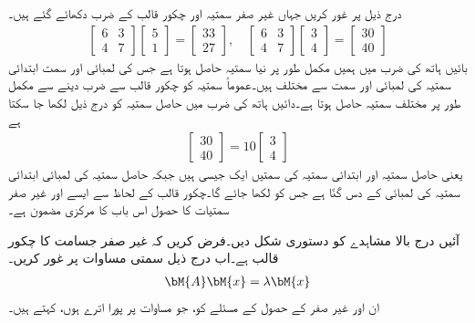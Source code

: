 درج ذیل پر غور کریں جہاں غیر صفر سمتیہ اور چکور قالب کے ضرب دکھائے گئے ہیں۔
\begin{align}\label{مساوات_امتیازی_پہلی_مثال}
\begin{bmatrix}6&3\\4&7  \end{bmatrix}\begin{bmatrix} 5\\1 \end{bmatrix}=\begin{bmatrix}33\\27  \end{bmatrix},\quad \begin{bmatrix}6&3\\4&7  \end{bmatrix}\begin{bmatrix} 3\\4 \end{bmatrix}=\begin{bmatrix}30\\40  \end{bmatrix}
\end{align} 
بائیں ہاتھ کی ضرب میں ہمیں مکمل طور پر نیا سمتیہ حاصل ہوتا ہے جس کی لمبائی اور سمت ابتدائی سمتیہ کی لمبائی اور سمت  سے مختلف ہیں۔عموماً  سمتیہ کو چکور قالب سے ضرب دینے  سے مکمل طور پر مختلف سمتیہ حاصل ہوتا ہے۔دائیں ہاتھ کی ضرب میں حاصل سمتیہ کو درج ذیل لکھا جا سکتا ہے 
\begin{align*}
\begin{bmatrix}30\\40  \end{bmatrix}=10\begin{bmatrix}3\\4  \end{bmatrix}
\end{align*}
یعنی حاصل سمتیہ اور ابتدائی سمتیہ کی سمتیں ایک جیسی ہیں جبکہ حاصل سمتیہ کی لمبائی ابتدائی سمتیہ کی لمبائی کے دس گنّا ہے جس کو  لکھا جائے گا۔چکور قالب  کے لحاظ سے  ایسے  اور غیر صفر سمتیات کا حصول اس باب کا مرکزی مضمون ہے۔  

آئیں درج بالا مشاہدے کو دستوری شکل دیں۔فرض کریں کہ  غیر صفر  جسامت کا چکور قالب ہے۔اب درج ذیل سمتی مساوات پر غور کریں۔
\begin{align}\label{مساوات_امتیازی_مسئلہ_ب}
\bM{A}\bM{x}=\lambda \bM{x}
\end{align}
ان  اور غیر صفر  کے حصول کے مسئلے کو، جو مساوات  پر پورا اترے ہوں،   کہتے ہیں۔

